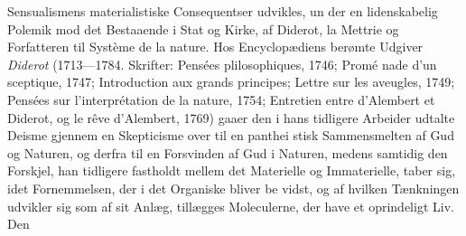\documentclass[12pt,a4paper]{book}
\begin{document}
Sensualismens materialistiske Consequentser udvikles, un\-%
der en lidenskabelig Polemik mod det Bestaaende i Stat og
Kirke, af Diderot, la Mettrie og Forfatteren til Système de la
nature. Hos Encyclopædiens berømte Udgiver \emph{Diderot}
(1713---1784. Skrifter: Pensées plilosophiques, 1746; Promé\-%
%
nade d'un sceptique, 1747; Introduction aux grands principes;
Lettre sur les aveugles, 1749; Pensées sur l'interprétation de
la nature, 1754; Entretien entre d'Alembert et Diderot, og le
rêve d'Alembert, 1769) gaaer den i hans tidligere Arbeider
udtalte Deisme gjennem en Skepticisme over til en panthei\-%
stisk Sammensmelten af Gud og Naturen, og derfra til en
Forsvinden af Gud i Naturen, medens samtidig den Forskjel,
han tidligere fastholdt mellem det Materielle og Immaterielle,
taber sig, idet Fornemmelsen, der i det Organiske bliver be\-%
vidst, og af hvilken Tænkningen udvikler sig som af sit Anlæg,
tillægges Moleculerne, der have et oprindeligt Liv. Den
\end{document}
